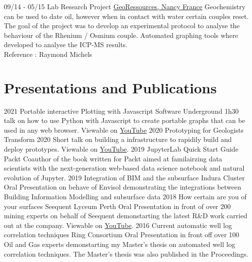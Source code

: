 \documentclass[]{friggeri-cv}
\begin{document}
\begin{entrylist}
	\entry
	{09/14 - 05/15}
	{Lab Research Project}
	{\href{http://georessources.univ-lorraine.fr/}{GeoRessources, Nancy France}}
	{Geochemistry can be used to date oil, however when in contact with water certain couples reset. The goal of the project was to develop an experimental protocol to analyse the behaviour of the Rhenium / Osmium couple. Automated graphing tools where developed to analyse the ICP-MS results.
		\\
		Reference : Raymond Michels}
\end{entrylist}
\section{Presentations and Publications}
\begin{entrylist}
	\entry
	{2021}
	{Portable interactive Plotting with Javascript}
	{Software Underground}
	{1h30 talk on how to use Python with Javascript to create portable graphs that can be used in any web browser. Viewable on \href{https://www.youtube.com/watch?v=j\_4wkMzGvKs}{YouTube}}
	\entry
	{2020}
	{Prototyping for Geologists}
	{Transform 2020}
	{Short talk on building a infrastructure to rapidily build and deploy prototypes.
	Viewable on \href{https://youtu.be/rUbvueIF5f8?t=4130}{YouTube}.}
	\entry
	{2019}
	{JupyterLab Quick Start Guide}
	{Packt}
	{Coauthor of the book written for Packt aimed at familairzing data scientists with the next-generation web-based data science notebook and natural evolution of Jupyter. }
	\entry
	{2019}
	{Integration of BIM and the subsurface}
	{Indura Cluster}
	{Oral Presentation on behave of Envisol demonstrating the integrations between Building Information Modelling and subsurface data}
	\entry
	{2018}
	{How certain are you of your surfaces}
	{Seequent Lyceum Perth}
	{Oral Presentation in front of over 200 mining experts on behalf of Seequent demonstarting the latest R\&D work carried out at the company. Viewable on \href{https://www.youtube.com/watch?v=jt26J5ljlA0}{YouTube}.}
	\entry
	{2016}
	{Current automatic well log correlation techniques}
	{Ring Consortium}
	{Oral Presentation in front off over 100 Oil and Gas experts demonstarting my Master's thesis on automated well log correlation techniques. The Master's thesis was also published in the Proceedings.}
\end{entrylist}
\vspace*{\fill}
\newpage
\vspace*{18pt}
\end{document}

